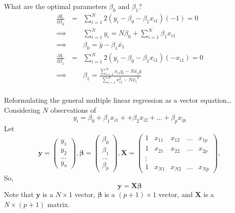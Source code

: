 \documentclass[aspectratio=169]{beamer}
\let \vec \mathbf
\begin{document}
    \begin{frame}{What are the optimal parameters $\beta_0$ and $\beta_1$?}
    \begin{eqnarray*}
        \frac{\partial L}{\partial\beta_0} & = & \sum_{i=1}^N 2 (y_i - \beta_0 - \beta_1 x_{i1})(-1) = 0\\
        \implies & & \sum_{i=1}^N y_i = N \beta_0 + \sum_{i=1}^N \beta_1 x_{i1} \\
        \implies & & \beta_0 = \bar{y} - \beta_1 \bar{x_{1}} \\
        \frac{\partial L}{\partial\beta_1} & = & \sum_{i=1}^N 2 (y_i - \beta_0 - \beta_1 x_{i1}) (-x_{i1}) = 0\\
        \implies & & \beta_1 = \frac{\sum_{i=1}^N x_{i1} y_i - N \bar{x_1}\bar{y}}{\sum_{i=1}^N x_{i1}^2 - N \bar{x_1}^2}\\
    \end{eqnarray*}
    \end{frame}

    \begin{frame}{Reformulating the general multiple linear regression as a vector equation…}
    Considering $N$ observations of
    \begin{equation*}
        y_i = \beta_0 + \beta_1 x_{i1} + + \beta_2 x_{i2} + ... + \beta_p x_{ip}
    \end{equation*}
    Let
    \begin{equation*}
        \vec{y} = \begin{pmatrix}y_1\\y_2\\...\\y_n\end{pmatrix}, \bm{\beta} = \begin{pmatrix}\beta_0\\\beta_1\\...\\\beta_p\end{pmatrix}, \vec{X} = \begin{pmatrix}1 & x_{11} & x_{12} & ... & x_{1p}\\
        1 & x_{21} & x_{22} & ... & x_{2p}\\
        \vdots & & & & \\
        1 & x_{N1} & x_{N2} & ... & x_{Np}\end{pmatrix}, 
    \end{equation*}
    So, 
    \begin{equation*}
        \vec{y} = \vec{X}\bm{\beta} 
    \end{equation*}
    Note that $\vec{y}$ is a $N \times 1$ vector,
    $\bm{\beta}$ is a $(p+1) \times 1$ vector, and $\vec{X}$ is a  $N \times (p+1)$ matrix.
\end{frame}
\end{document}

